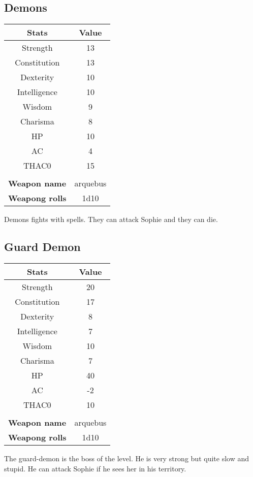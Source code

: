 \subsection{Demons}
\begin{table}[H]
  \centering
\begin{tabular}{|c|c|}
\hline
\rowcolor[HTML]{C0C0C0} 
\textbf{Stats} & \textbf{Value} \\ \hline
Strength & 13 \\ \hline
Constitution & 13 \\ \hline
Dexterity & 10 \\ \hline
Intelligence & 10 \\ \hline
Wisdom & 9 \\ \hline
Charisma & 8 \\ \hline
HP & 10 \\ \hline
AC & 4 \\ \hline
THAC0 & 15 \\ \hline
\multicolumn{1}{|l|}{} & \multicolumn{1}{l|}{} \\ \hline
\multicolumn{1}{|l|}{\cellcolor[HTML]{9B9B9B}\textbf{Weapon name}} & \multicolumn{1}{c|}{arquebus} \\ \hline
\multicolumn{1}{|l|}{\cellcolor[HTML]{9B9B9B}\textbf{Weapong rolls}} & \multicolumn{1}{c|}{1d10} \\ \hline
\end{tabular}
\end{table}
Demons fights with spells. They can attack Sophie and they can die. 

\subsection{Guard Demon}
\begin{table}[H]
  \centering
\begin{tabular}{|c|c|}
\hline
\rowcolor[HTML]{C0C0C0} 
\textbf{Stats} & \textbf{Value} \\ \hline
Strength & 20 \\ \hline
Constitution & 17 \\ \hline
Dexterity & 8 \\ \hline
Intelligence & 7 \\ \hline
Wisdom & 10 \\ \hline
Charisma & 7 \\ \hline
HP & 40 \\ \hline
AC & -2 \\ \hline
THAC0 & 10 \\ \hline
\multicolumn{1}{|l|}{} & \multicolumn{1}{l|}{} \\ \hline
\multicolumn{1}{|l|}{\cellcolor[HTML]{9B9B9B}\textbf{Weapon name}} & \multicolumn{1}{c|}{arquebus} \\ \hline
\multicolumn{1}{|l|}{\cellcolor[HTML]{9B9B9B}\textbf{Weapong rolls}} & \multicolumn{1}{c|}{1d10} \\ \hline
\end{tabular}
\end{table}
The guard-demon is the boss of the level. He is very strong but quite slow and stupid.
He can attack Sophie if he sees her in his territory. 
